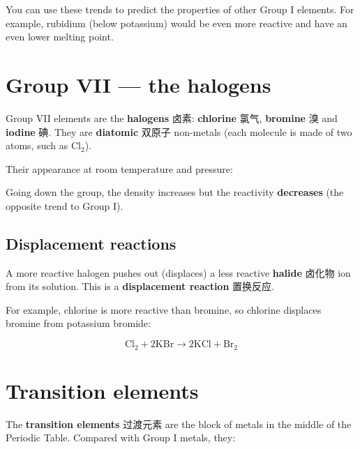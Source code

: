\documentclass[11pt]{article}
\begin{document}
You can use these trends to predict the properties of other Group I elements. For example, rubidium (below potassium) would be even more reactive and have an even lower melting point.

\section*{Group VII — the halogens}

Group VII elements are the \textbf{halogens} 卤素: \textbf{chlorine} 氯气, \textbf{bromine} 溴 and \textbf{iodine} 碘. They are \textbf{diatomic} 双原子 non-metals (each molecule is made of two atoms, such as $\text{Cl}_2$).

Their appearance at room temperature and pressure:

\begin{center}
\end{center}

Going down the group, the density increases but the reactivity \textbf{decreases} (the opposite trend to Group I).

\subsection*{Displacement reactions}

A more reactive halogen pushes out (displaces) a less reactive \textbf{halide} 卤化物 ion from its solution. This is a \textbf{displacement reaction} 置换反应.

For example, chlorine is more reactive than bromine, so chlorine displaces bromine from potassium bromide:

\[
\text{Cl}_2 + 2\text{KBr} \rightarrow 2\text{KCl} + \text{Br}_2
\]

\section*{Transition elements}

The \textbf{transition elements} 过渡元素 are the block of metals in the middle of the Periodic Table. Compared with Group I metals, they:
\end{document}
